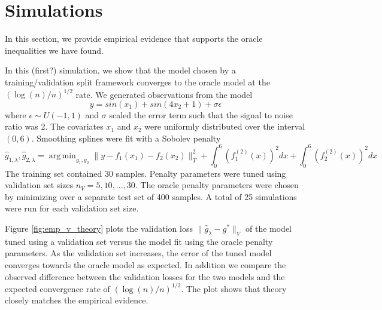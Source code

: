 \documentclass[12pt]{article}
\DeclareMathOperator*{\argmin}{arg\,min}
\begin{document}
\section{Simulations}\label{sec:simulations}

In this section, we provide empirical evidence that supports the oracle inequalities we have found.

In this (first?) simulation, we show that the model chosen by a training/validation split framework converges to the oracle model at the $(\log(n)/n)^{1/2}$ rate. We generated observations from the model
\begin{equation}
y = sin(x_1) + sin(4 x_2 + 1) + \sigma \epsilon
\end{equation}
where $\epsilon \sim U(-1,1)$ and $\sigma$ scaled the error term such that the signal to noise ratio was 2.
The covariates $x_1$ and $x_2$ were uniformly distributed over the interval $(0,6)$.
Smoothing splines were fit with a Sobolev penalty
\begin{equation}
\hat{g}_{1, \lambda}, \hat{g}_{2, \lambda} = \argmin_{g_1, g_2} \| y - f_1(x_1) - f_2(x_2) \|_T^2 + \int_0^6 (f_1^{(2)}(x))^2 dx + \int_0^6 (f_2^{(2)}(x))^2 dx
\end{equation}
The training set contained 30 samples. Penalty parameters were tuned using validation set sizes $n_V = 5, 10, ..., 30$. The oracle penalty parameters were chosen by minimizing over a separate test set of 400 samples. A total of 25 simulations were run for each validation set size.

Figure \ref{fig:emp_v_theory} plots the validation loss $\| \hat{g}_{\lambda} - g^* \|_V$ of the model tuned using a validation set versus the model fit using the oracle penalty parameters. As the validation set increases, the error of the tuned model converges towards the oracle model as expected. In addition we compare the observed difference between the validation losses for the two models and the expected convergence rate of $(\log(n)/n)^{1/2}$. The plot shows that theory closely matches the empirical evidence.
\end{document}
